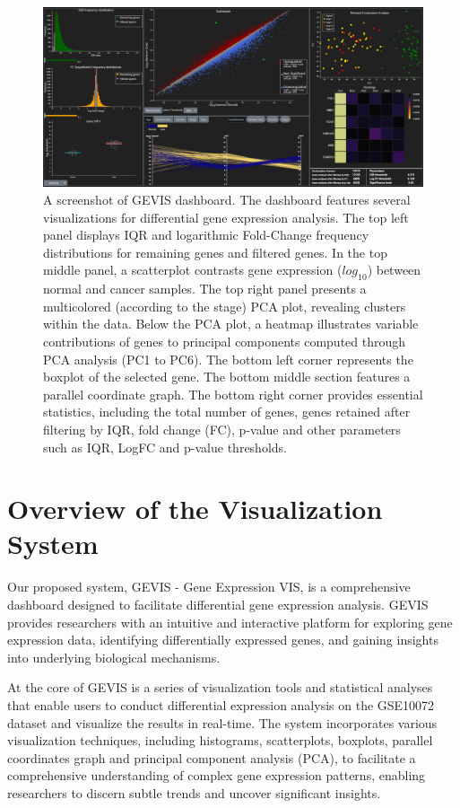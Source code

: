 \documentclass[
	a4paper, %
	10pt, %
	unnumberedsections, %
	twoside, %
]{LTJournalArticle}
\begin{document}
\begin{figure} %
	\includegraphics[width=\linewidth]{Figures/GEVIS Dashboard.png}
	\caption{A screenshot of GEVIS dashboard. The dashboard features several visualizations for differential gene expression analysis. The top left panel displays IQR and logarithmic Fold-Change frequency distributions for remaining genes and filtered genes. In the top middle panel, a scatterplot contrasts gene expression ($log_{10}$) between normal and cancer samples. The top right panel presents a multicolored (according to the stage) PCA plot, revealing clusters within the data. Below the PCA plot, a heatmap illustrates  variable contributions of genes to principal components computed through PCA analysis (PC1 to PC6). The bottom left corner represents the boxplot of the selected gene. The bottom middle section features a parallel coordinate graph. The bottom right corner provides essential statistics, including the total number of genes, genes retained after filtering by IQR, fold change (FC), p-value and other parameters such as IQR, LogFC and p-value thresholds.}
	\label{fig:gevis_dashboard}
\end{figure}


\section{Overview of the Visualization System}

Our proposed system, GEVIS - Gene Expression VIS, is a comprehensive dashboard designed to facilitate differential gene expression analysis. GEVIS provides researchers with an intuitive and interactive platform for exploring gene expression data, identifying differentially expressed genes, and gaining insights into underlying biological mechanisms.

At the core of GEVIS is a series of visualization tools and statistical analyses that enable users to conduct differential expression analysis on the GSE10072 dataset and visualize the results in real-time. The system incorporates various visualization techniques, including histograms, scatterplots, boxplots, parallel coordinates graph and principal component analysis (PCA), to facilitate a comprehensive understanding of complex gene expression patterns, enabling researchers to discern subtle trends and uncover significant insights.
\end{document}

